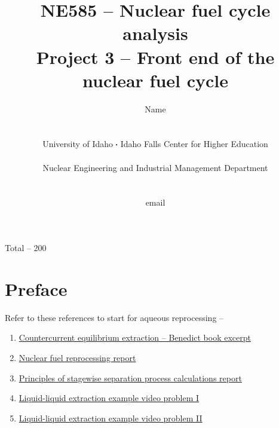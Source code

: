 \documentclass[11pt,a4paper]{article}
\newcommand*\sq{\mathbin{\vcenter{\hbox{\rule{.3ex}{.3ex}}}}} %
\begin{document}
\begin{titlepage}
    \title{
        NE585 -- Nuclear fuel cycle analysis\\
        Project 3 -- Front end of the nuclear fuel cycle\\
    }
    \author{
        Name
        \\ \\ \\
        University of Idaho $\sq$ Idaho Falls Center for Higher Education
        \\ \\
        Nuclear Engineering and Industrial Management Department
        \\ \\ \\
        email 
    }
\clearpage %
\maketitle
\vspace*{\fill}
\begin{flushright}{
        Total -- 200
}
\end{flushright}
\thispagestyle{empty} %
\end{titlepage}


\section*{Preface}
Refer to these references to start for aqueous reprocessing --
\begin{enumerate}
    \item\href{https://piazza.com/class_profile/get_resource/mcf5xaxnhxh5qs/mcf5yw70pmh7c6}{Countercurrent equilibrium extraction -- Benedict book excerpt}
    \item\href{https://piazza.com/class_profile/get_resource/ll13mxo3tb15l/ll2oqtgzlro4jr}{Nuclear fuel reprocessing report}
    \item\href{https://piazza.com/class_profile/get_resource/ll13mxo3tb15l/ll2oqumeord4pf}{Principles of stagewise separation process calculations report}
    \item\href{https://youtu.be/HGwHLaPhw30}{Liquid-liquid extraction example video problem I}
    \item\href{https://youtu.be/vK8XGYwnZv4}{Liquid-liquid extraction example video problem II}
\end{enumerate}
\end{document}
